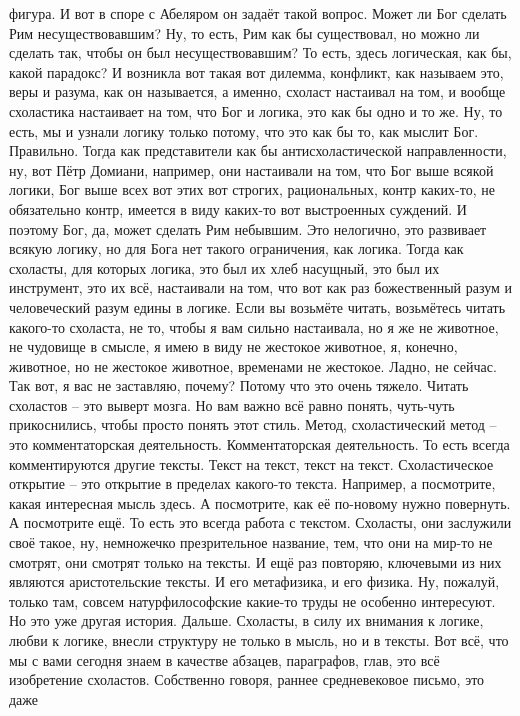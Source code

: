 фигура. И вот в споре с Абеляром он задаёт такой вопрос. Может ли Бог сделать
Рим несуществовавшим? Ну, то есть, Рим как бы существовал, но можно ли сделать
так, чтобы он был несуществовавшим? То есть, здесь логическая, как бы, какой
парадокс? И возникла вот такая вот дилемма, конфликт, как называем это, веры и
разума, как он называется, а именно, схоласт настаивал на том, и вообще
схоластика настаивает на том, что Бог и логика, это как бы одно и то же. Ну, то
есть, мы и узнали логику только потому, что это как бы то, как мыслит Бог.
Правильно. Тогда как представители как бы антисхоластической направленности, ну,
вот Пётр Домиани, например, они настаивали на том, что Бог выше всякой логики,
Бог выше всех вот этих вот строгих, рациональных, контр каких-то, не обязательно
контр, имеется в виду каких-то вот выстроенных суждений. И поэтому Бог, да,
может сделать Рим небывшим. Это нелогично, это развивает всякую логику, но для
Бога нет такого ограничения, как логика. Тогда как схоласты, для которых логика,
это был их хлеб насущный, это был их инструмент, это их всё, настаивали на том,
что вот как раз божественный разум и человеческий разум едины в логике. Если вы
возьмёте читать, возьмётесь читать какого-то схоласта, не то, чтобы я вам сильно
настаивала, но я же не животное, не чудовище в смысле, я имею в виду не жестокое
животное, я, конечно, животное, но не жестокое животное, временами не жестокое.
Ладно, не сейчас. Так вот, я вас не заставляю, почему? Потому что это очень
тяжело. Читать схоластов – это выверт мозга. Но вам важно всё равно понять,
чуть-чуть прикоснились, чтобы просто понять этот стиль. Метод, схоластический
метод – это комментаторская деятельность. Комментаторская деятельность. То есть
всегда комментируются другие тексты. Текст на текст, текст на текст.
Схоластическое открытие – это открытие в пределах какого-то текста. Например, а
посмотрите, какая интересная мысль здесь. А посмотрите, как её по-новому нужно
повернуть. А посмотрите ещё. То есть это всегда работа с текстом. Схоласты, они
заслужили своё такое, ну, немножечко презрительное название, тем, что они на
мир-то не смотрят, они смотрят только на тексты. И ещё раз повторяю, ключевыми
из них являются аристотельские тексты. И его метафизика, и его физика. Ну,
пожалуй, только там, совсем натурфилософские какие-то труды не особенно
интересуют. Но это уже другая история. Дальше. Схоласты, в силу их внимания к
логике, любви к логике, внесли структуру не только в мысль, но и в тексты. Вот
всё, что мы с вами сегодня знаем в качестве абзацев, параграфов, глав, это всё
изобретение схоластов. Собственно говоря, раннее средневековое письмо, это даже
